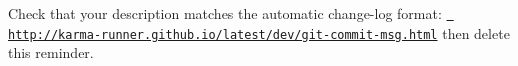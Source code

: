 Check that your description matches the automatic change-\/log format\+: \href{http://karma-runner.github.io/latest/dev/git-commit-msg.html}{\texttt{ http\+://karma-\/runner.\+github.\+io/latest/dev/git-\/commit-\/msg.\+html}} then delete this reminder. 